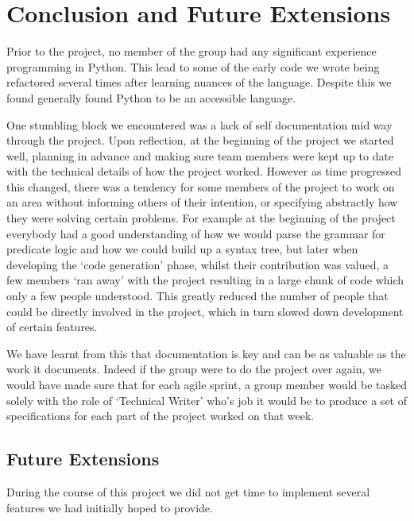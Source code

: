 \documentclass[a4paper, 11pt]{article}
\begin{document}
\section{Conclusion and Future Extensions}

  Prior to the project, no member of the group had any significant
  experience programming in Python.  This lead to some of the early code we
  wrote being refactored several times after learning nuances of the
  language. Despite this we found generally found Python to be an accessible
  language.

  One stumbling block we encountered was a lack of self documentation mid way
  through the project. Upon reflection, at the beginning of the project we 
  started well, planning in advance and making sure team members were kept up 
  to date with the technical details of how the project worked. However as time 
  progressed this changed, there was a tendency for some members of the project 
  to work on an area without informing others of their intention, or specifying 
  abstractly how they were solving certain problems. For example at the beginning 
  of the project everybody had a good understanding of how we would parse the 
  grammar for predicate logic and how we could build up a syntax tree, but later 
  when developing the `code generation' phase, whilst their contribution was
  valued, a few members `ran away' with the project resulting in a large chunk of code which only 
  a few people understood. This greatly reduced the number of people that could
  be directly involved in the project, which in turn slowed down development of certain
  features. 
  
  We have learnt from this that documentation is key and can be as
  valuable as the work it documents. Indeed if the
  group were to do the project over again, we would have made sure that for each
  agile sprint, a group member would be tasked solely with the role of `Technical
  Writer' who's job it would be to produce a set of specifications for each part
  of the project worked on that week.

  \subsection{Future Extensions}
    During the course of this project we did not get time to implement several
    features we had initially hoped to provide.
\end{document}
